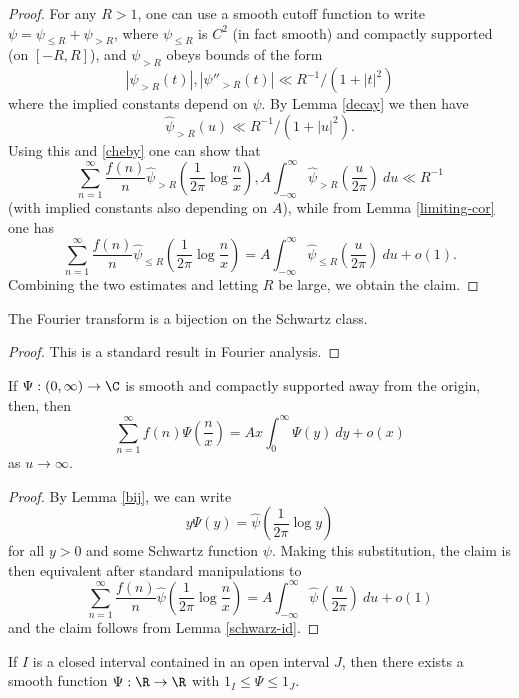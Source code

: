 \begin{proof}
For any $R>1$, one can use a smooth cutoff function to write $\psi = \psi_{\leq R} + \psi_{>R}$, where $\psi_{\leq R}$ is $C^2$ (in fact smooth) and compactly supported (on $[-R,R]$), and $\psi_{>R}$ obeys bounds of the form
$$ |\psi_{>R}(t)|, |\psi''_{>R}(t)| \ll R^{-1} / (1 + |t|^2) $$
where the implied constants depend on $\psi$.  By Lemma \ref{decay} we then have
$$ \hat \psi_{>R}(u) \ll R^{-1} / (1+|u|^2).$$
Using this and \eqref{cheby} one can show that
$$ \sum_{n=1}^\infty \frac{f(n)}{n} \hat \psi_{>R}( \frac{1}{2\pi} \log \frac{n}{x} ), A \int_{-\infty}^\infty \hat \psi_{>R} (\frac{u}{2\pi})\ du \ll R^{-1} $$
(with implied constants also depending on $A$), while from Lemma \ref{limiting-cor} one has
$$ \sum_{n=1}^\infty \frac{f(n)}{n} \hat \psi_{\leq R}( \frac{1}{2\pi} \log \frac{n}{x} ) = A \int_{-\infty}^\infty \hat \psi_{\leq R} (\frac{u}{2\pi})\ du + o(1).$$
Combining the two estimates and letting $R$ be large, we obtain the claim.
\end{proof}

\begin{lemma}\label{bij}  The Fourier transform is a bijection on the Schwartz class.
\end{lemma}

\begin{proof}  This is a standard result in Fourier analysis.
\end{proof}

\begin{corollary}\label{WienerIkeharaSmooth}
  If $\Psi: (0,\infty) \to \C$ is smooth and compactly supported away from the origin, then, then
$$ \sum_{n=1}^\infty f(n) \Psi( \frac{n}{x} ) = A x \int_0^\infty \Psi(y)\ dy + o(x)$$
as $u \to \infty$.
\end{corollary}

\begin{proof}
 By Lemma \ref{bij}, we can write
$$ y \Psi(y) = \hat \psi( \frac{1}{2\pi} \log y )$$
for all $y>0$ and some Schwartz function $\psi$.  Making this substitution, the claim is then equivalent after standard manipulations to
$$ \sum_{n=1}^\infty \frac{f(n)}{n} \hat \psi( \frac{1}{2\pi} \log \frac{n}{x} ) = A \int_{-\infty}^\infty \hat \psi(\frac{u}{2\pi})\ du + o(1)$$
and the claim follows from Lemma \ref{schwarz-id}.
\end{proof}

\begin{lemma}\label{smooth-ury}  If $I$ is a closed interval contained in an open interval $J$, then there exists a smooth function $\Psi: \R \to \R$ with $1_I \leq \Psi \leq 1_J$.
\end{lemma}

